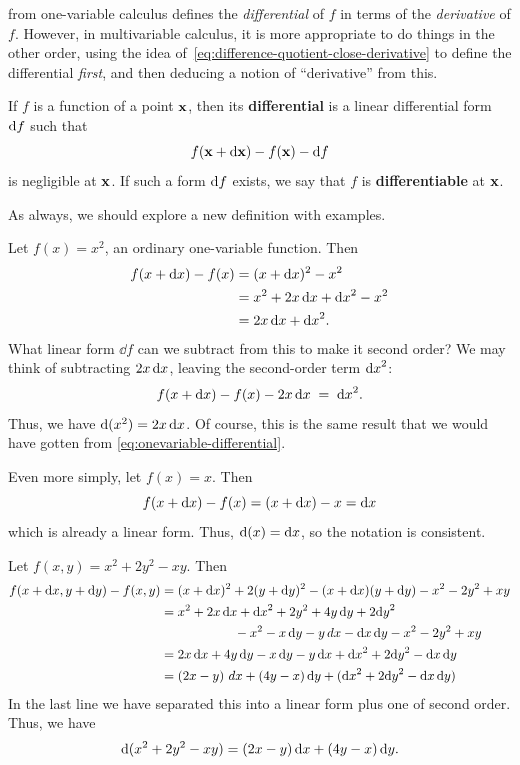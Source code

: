  from one-variable calculus defines the \emph{differential} of $f$ in terms of the \emph{derivative} of $f$.
However, in multivariable calculus, it is more appropriate to do things in the other order, using the idea of~\cref{eq:difference-quotient-close-derivative} to define the differential \emph{first}, and then deducing a notion of ``derivative'' from this.

\begin{defn}\label{def:differential}
  If $f$ is a function of a point $\mathbf{x}$, then its \textbf{differential} is a linear differential form ${\mathrm{d} f}$ such that
  \[ f(\mathbf{x} + \mathrm{d}\mathbf{x}) - f(\mathbf{x}) - {\mathrm{d} f} \]
  is negligible at $\mathbf{x}$.
  If such a form ${\mathrm{d} f}$ exists, we say that $f$ is \textbf{differentiable} at $\mathbf{x}$.
\end{defn}

As always, we should explore a new definition with examples.

\begin{eg}
  Let $f(x) = x^2$, an ordinary one-variable function.
  Then
  \begin{align*}
    f(x + {\mathrm{d} x}) - f(x) &= (x+{\mathrm{d} x})^2 - x^2\\
    &= x^2 + 2 x \, {\mathrm{d} x} + {\mathrm{d} x}^2 - x^2\\
    &= 2x \, {\mathrm{d} x} + {\mathrm{d} x} ^2.
  \end{align*}
  What linear form $\dd f$ can we subtract from this to make it second order?
  We may think of subtracting $2x \, {\mathrm{d} x}$, leaving the second-order term ${\mathrm{d} x}^2$:
  \[ f(x + {\mathrm{d} x}) - f(x) - 2x \, {\mathrm{d} x} \;=\; {\mathrm{d} x}^2. \]
  Thus, we have $\mathrm{d}(x^2) = 2 x \, {\mathrm{d} x}$.
  Of course, this is the same result that we would have gotten from \cref{eq:onevariable-differential}.
\end{eg}

\begin{eg}
  Even more simply, let $f(x) = x$.
  Then
  \[f(x+{\mathrm{d} x}) - f(x) = (x+{\mathrm{d} x})-x = {\mathrm{d} x} \]
  which is already a linear form.
  Thus, $\mathrm{d}(x) = {\mathrm{d} x}$, so the notation is consistent.
\end{eg}

\begin{eg}
  Let $f(x,y) = x^2 + 2y^2 - xy$.
  Then
  \begin{align*}
    f(x+{\mathrm{d} x},y+{\mathrm{d} y}) - f(x,y)
    &= (x+{\mathrm{d} x})^2 + 2(y+{\mathrm{d} y})^2 - (x+{\mathrm{d} x})(y+{\mathrm{d} y}) - x^2 - 2y^2 + xy\\
    &= x^2 + 2 x \, {\mathrm{d} x} + {\mathrm{d} x}^2 + 2y^2 + 4y\,{\mathrm{d} y} + 2{\mathrm{d} y}^2\\
    & \hspace{2cm} - x^2 - x \, {\mathrm{d} y} - y \, dx - {\mathrm{d} x}\, {\mathrm{d} y} - x^2 - 2y^2 + xy\\
    &= 2x\,{\mathrm{d} x} + 4y\,{\mathrm{d} y} - x\,{\mathrm{d} y} - y\,{\mathrm{d} x} + {\mathrm{d} x}^2 + 2{\mathrm{d} y}^2 - {\mathrm{d} x}\,{\mathrm{d} y}\\
    &= (2x-y)\,\,dx + (4y-x)\,{\mathrm{d} y} + ({\mathrm{d} x}^2 + 2{\mathrm{d} y}^2 - {\mathrm{d} x}\,{\mathrm{d} y})
  \end{align*}
  In the last line we have separated this into a linear form plus one of second order.
  Thus, we have
  \[ \mathrm{d}(x^2 + 2y^2 - xy) = (2x-y)\,{\mathrm{d} x} + (4y-x)\,{\mathrm{d} y} .\]
\end{eg}

